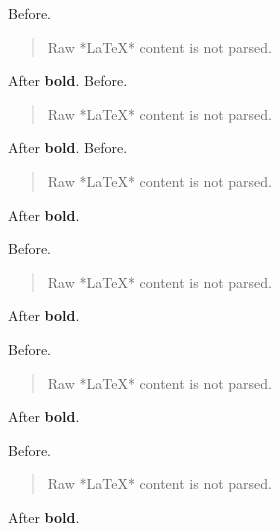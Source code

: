Before.


\begin{quote}
Raw *LaTeX* content is not parsed.
\end{quote}

After \textbf{bold}.
Before.


\begin{quote}
Raw *LaTeX* content is not parsed.
\end{quote}

After \textbf{bold}.
Before.


\begin{quote}
Raw *LaTeX* content is not parsed.
\end{quote}

After \textbf{bold}.
\begin{frame}[t]
Before.


\begin{quote}
Raw *LaTeX* content is not parsed.
\end{quote}

After \textbf{bold}.
\end{frame}

\begin{frame}[t]
Before.


\begin{quote}
Raw *LaTeX* content is not parsed.
\end{quote}

After \textbf{bold}.
\end{frame}

\begin{frame}[t]
Before.


\begin{quote}
Raw *LaTeX* content is not parsed.
\end{quote}

After \textbf{bold}.
\end{frame}

